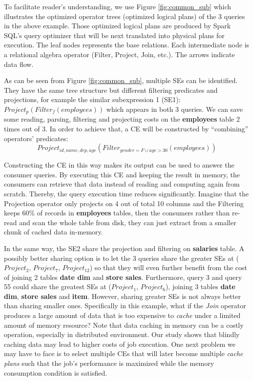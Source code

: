 To facilitate reader's understanding, we use Figure \ref{fig:common_sub} which illustrates the optimized operator trees (optimized logical plans) of the 3 queries in the above example. Those optimized logical plans are produced by Spark SQL's query optimizer that will be next translated into physical plans for execution. The leaf nodes represents the base relations. Each intermediate node is a relational algebra operator (Filter, Project, Join, etc.). The arrows indicate data flow.

As can be seen from Figure \ref{fig:common_sub}, multiple SEs can be identified. They have the same tree structure but different filtering predicates and projections, for example the similar subexpression 1 (SE1): $Project_p(Filter_f(employees))$ which appears in both 3 queries. We can save some reading, parsing, filtering and projecting costs on the \textbf{employees} table 2 times out of 3. In order to achieve that, a CE will be constructed by ``combining'' operators' predicates: \[Project_{id, name, dep, age}(Filter_{gender=F \cup age>30}(employees))\]

Constructing the CE in this way makes its output can be used to answer the consumer queries. By executing this CE and keeping the result in memory, the consumers can retrieve that data instead of reading and computing again from scratch. Thereby, the query execution time reduces significantly. Imagine that the Projection operator only projects on 4 out of total 10 columns and the Filtering keeps 60\% of records in \textbf{employees} tables, then the consumers rather than re-read and scan the whole table from disk, they can just extract from a smaller chunk of cached data in-memory. 

In the same way, the SE2 share the projection and filtering on \textbf{salaries} table. A possibly better sharing option is to let the 3 queries share the greater SEs at ($Project_2$, $Project_7$, $Project_{12}$) so that they will even further benefit from the cost of joining 2 tables \textbf{date dim} and \textbf{store sales}. Furthermore, query 3 and query 55 could share the greatest SEs at ($Project_1$, $Project_6$), joining 3 tables \textbf{date dim}, \textbf{store sales} and \textbf{item}. However, sharing greater SEs is not always better than sharing smaller ones. Specifically in this example, what if the \emph{Join} operator produces a large amount of data that is too expensive to \emph{cache} under a limited amount of memory resource? Note that data caching in memory can be a costly operation, especially in distributed environment. Our study shows that blindly caching data may lead to higher costs of job execution. One next problem we may have to face is to select multiple CEs that will later become multiple \emph{cache plans} such that the job's performance is maximized while the memory consumption condition is satisfied.

